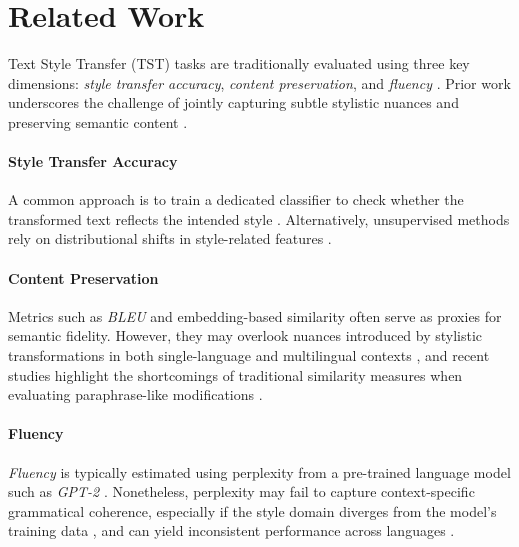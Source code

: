 \section{Related Work}
\label{sec:related_work}

Text Style Transfer (\textsc{TST}) tasks are traditionally evaluated using three key dimensions: \emph{style transfer accuracy}, \emph{content preservation}, and \emph{fluency} \cite{mukherjee2024textstyletransferintroductory, hu2022text, jin2022deep}. Prior work underscores the challenge of jointly capturing subtle stylistic nuances and preserving semantic content \cite{briakou2021review, tikhonov2019style}.

\paragraph{Style Transfer Accuracy}
A common approach is to train a dedicated classifier to check whether the transformed text reflects the intended style \cite{prabhumoye2018style, shen2017style}. Alternatively, unsupervised methods rely on distributional shifts in style-related features \cite{yang2018unsupervised, tikhonov2019style}.

\paragraph{Content Preservation}
Metrics such as \emph{BLEU} \cite{papineni2002bleu} and embedding-based similarity \cite{rahutomo2012semantic, reimers2019sentence} often serve as proxies for semantic fidelity. However, they may overlook nuances introduced by stylistic transformations in both single-language and multilingual contexts \cite{yamshchikov2021style, briakou2021evaluating}, and recent studies highlight the shortcomings of traditional similarity measures when evaluating paraphrase-like modifications \cite{yamshchikov2021style, briakou2021review}.

\paragraph{Fluency}
\emph{Fluency} is typically estimated using perplexity from a pre-trained language model such as \emph{GPT-2} \cite{radford2019language}. Nonetheless, perplexity may fail to capture context-specific grammatical coherence, especially if the style domain diverges from the model’s training data \cite{tikhonov2019style, briakou2021review}, and can yield inconsistent performance across languages \cite{briakou2021evaluating}.